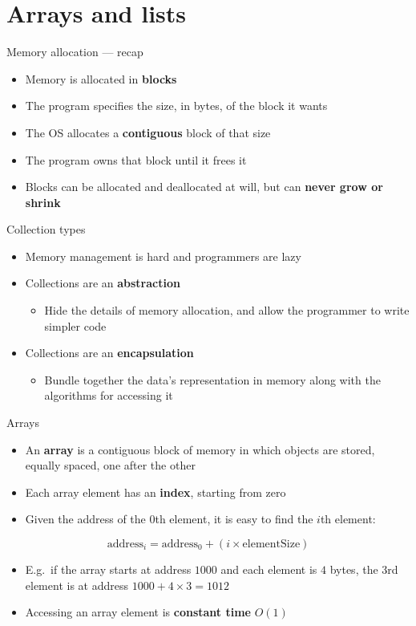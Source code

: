 \part{Arrays and lists}
\frame{\partpage}

\begin{frame}{Memory allocation --- recap}
	\begin{itemize}
		\pause\item Memory is allocated in \textbf{blocks}
		\pause\item The program specifies the size, in bytes, of the block it wants
		\pause\item The OS allocates a \textbf{contiguous} block of that size
		\pause\item The program owns that block until it frees it
		\pause\item Blocks can be allocated and deallocated at will, but can \textbf{never grow or shrink}
	\end{itemize}
\end{frame}

\begin{frame}{Collection types}
	\begin{itemize}
		\pause\item Memory management is hard and programmers are lazy
		\pause\item Collections are an \textbf{abstraction}
			\begin{itemize}
				\pause\item Hide the details of memory allocation, and allow the programmer to write simpler code
			\end{itemize}
		\pause\item Collections are an \textbf{encapsulation}
			\begin{itemize}
				\pause\item Bundle together the data's representation in memory along with the algorithms for accessing it
			\end{itemize}
	\end{itemize}
\end{frame}

\begin{frame}{Arrays}
	\begin{itemize}
		\pause\item An \textbf{array} is a contiguous block of memory in which objects are stored,
			equally spaced, one after the other
		\pause\item Each array element has an \textbf{index}, starting from zero
		\pause\item Given the address of the $0$th element, it is easy to find the $i$th element:
	\end{itemize}
	$$ \text{address}_i = \text{address}_0 + (i \times \text{elementSize}) $$
	\begin{itemize}
		\pause\item E.g.\ if the array starts at address $1000$ and each element is $4$ bytes,
			the 3rd element is at address $1000 + 4 \times 3 = 1012$
		\pause\item Accessing an array element is \textbf{constant time} $O(1)$
	\end{itemize}
\end{frame}

